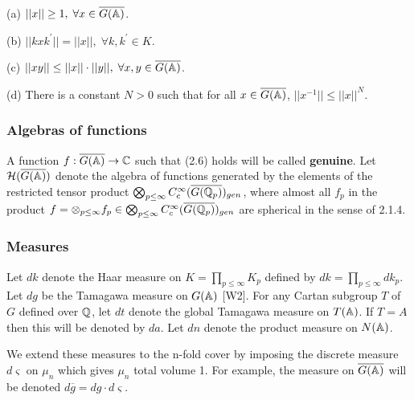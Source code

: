 \begin{lemma}
(a) $||x||\geq 1,\;\forall x\in \overline{G({\Bbb{A}})}$.

(b) $||kxk^{\prime }||=||x||,\;\forall k,k^{\prime }\in K$.

(c) $||xy||\leq ||x||\cdot ||y||,\;\forall x,y\in \overline{G({\Bbb{A}})}$.

(d) There is a constant $N>0$ such that for all
$x\in \overline{G({\Bbb{A}})}$,
$||x^{-1}||\leq ||x||^N$.
\end{lemma}

\subsubsection{Algebras of functions}

A function $f:\overline{G({\Bbb{A}})}\rightarrow {\Bbb{C}}$
such that (2.6)
holds will be called \textbf{genuine}. Let 
${\cal{H}}(\overline{G({\Bbb{A}})})$ denote the algebra of 
functions generated by the elements of the
restricted tensor product 
$\bigotimes_{p\leq \infty }
C_c^\infty (\overline{G({\Bbb{Q}}_p)})_{gen}$, 
where almost all $f_p$ in the product 
$f=\otimes _{p\leq \infty}f_p\in 
\bigotimes_{p\leq \infty }C_c^\infty (\overline{G({\Bbb{Q}}_p)})_{gen}$ are
spherical in the sense of 2.1.4.

\subsubsection{Measures}

Let $dk$ denote the Haar measure on $K=\prod_{p\leq \infty }K_p$
defined by $dk=\prod_{p\leq \infty }dk_p$.
Let $dg$ be the Tamagawa measure on
$G({\Bbb{A}})$ [W2]. For any Cartan subgroup
$T$ of $G$ defined over ${\Bbb{Q}}$, let $dt$
denote the global Tamagawa measure on $T({\Bbb{A}})$. If $T=A$ then this will
be denoted by $da$. Let $dn$ denote the product measure on $N({\Bbb{A}})$.

We extend these measures to the n-fold cover by imposing the discrete
measure $d\varsigma $ on $\mu _n$ which gives $\mu _n$ total volume 1. For
example, the measure on $\overline{G({\Bbb{A}})}$ will be denoted
$d\overline{g}=dg\cdot d\varsigma $.













